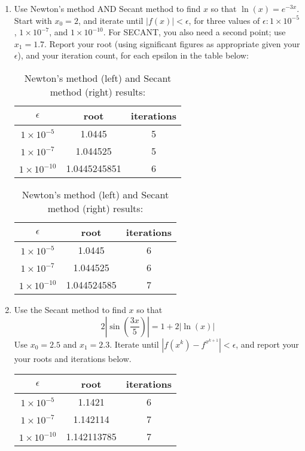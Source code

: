 \documentclass[11pt]{amsart}
\theoremstyle{plain}
\theoremstyle{definition}
\begin{document}
\begin{enumerate}
\begin{enumerate}
\bigskip

\item Use Newton's method AND Secant method to find $x$ so that $\ln(x) = e^{-3x}$. Start with $x_0 = 2$,
and iterate until $|f(x)| < \epsilon$, for three values of $\epsilon: 1\times 10^{-5}$, 
$1\times 10^{-7}$, and $1\times 10^{-10}$. 
For SECANT, you also need a second point; use $x_1 = 1.7$.
Report your  root (using significant figures
as appropriate given your $\epsilon$), 
and your iteration count, for each epsilon in the table below:

\begin{table}[H]
\caption{Newton's method (left) and Secant method (right) results:}
\begin{tabular}{|c|c|c|}\hline
$\epsilon$ & root & iterations \\ \hline
$1\times 10^{-5}$ & 1.0445 & 5 \\ \hline
$1\times 10^{-7}$ & 1.044525 & 5 \\ \hline
$1\times 10^{-10}$ & 1.0445245851& 6 \\ \hline
\end{tabular}
\begin{tabular}{|c|c|c|}\hline
$\epsilon$ & root & iterations \\ \hline
$1\times 10^{-5}$ & 1.0445 & 6 \\ \hline
$1\times 10^{-7}$ & 1.044525 & 6 \\ \hline
$1\times 10^{-10}$ & 1.044524585 & 7 \\ \hline
\end{tabular}
\end{table}
\bigskip

\item Use the Secant method to find $x$ so that 
\[
2\left|\sin\left(\frac{3x}{5}\right) \right| = 1 + 2|\ln(x)|
\]
Use $x_0 = 2.5$ and $x_1  = 2.3$. Iterate until $|f(x^k) - f^{x^{k+1}}|<\epsilon$, 
and report your your roots and iterations below.  

\begin{tabular}{|c|c|c|}\hline
$\epsilon$ & root & iterations \\ \hline
$1\times 10^{-5}$ & 1.1421 & 6 \\ \hline
$1\times 10^{-7}$ & 1.142114 & 7 \\ \hline
$1\times 10^{-10}$ & 1.142113785 & 7 \\ \hline
\end{tabular}

\end{enumerate}




\end{enumerate}
\end{document}
